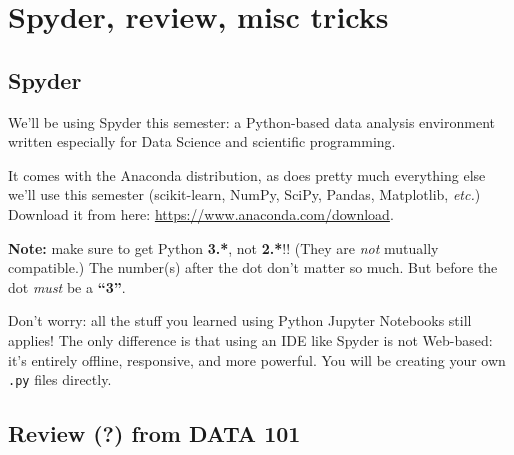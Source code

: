 
\chapter{Spyder, review, misc tricks}

\section{Spyder}
We'll be using Spyder this semester: a Python-based data analysis environment
written especially for Data Science and scientific programming.

It comes with the Anaconda distribution, as does pretty much everything else
we'll use this semester (scikit-learn, NumPy, SciPy, Pandas, Matplotlib,
\textit{etc.}) Download it from here: \url{https://www.anaconda.com/download}. 

\textbf{Note:} make sure to get Python \textbf{3.*}, not \textbf{2.*}!! (They
are \textit{not} mutually compatible.) The number(s) after the dot don't
matter so much. But before the dot \textit{must} be a \textbf{``3''}.

Don't worry: all the stuff you learned using Python Jupyter Notebooks still
applies! The only difference is that using an IDE like Spyder is not
Web-based: it's entirely offline, responsive, and more powerful. You will be
creating your own \texttt{.py} files directly.


\section{Review (?) from DATA 101}

